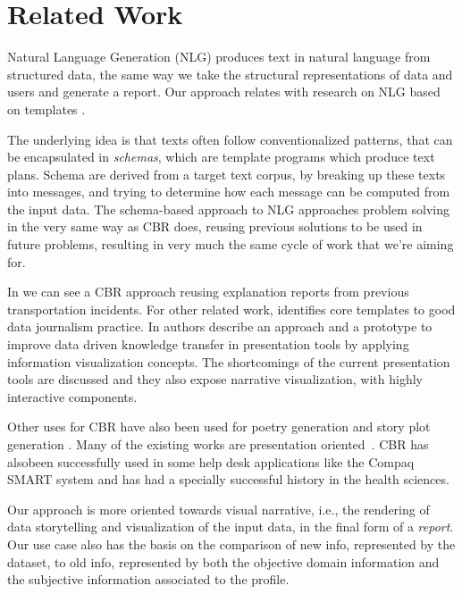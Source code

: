 \section{Related Work}
\label{cap1:sec:relatedwork}

Natural Language Generation (NLG) produces text in natural language from structured data, the same way we take the structural representations of data and users and generate a report.
Our approach relates with research on NLG  based on templates \cite{McKeown}.

The underlying idea is that texts often follow conventionalized patterns, that can be encapsulated in {\it schemas}, which are template programs which produce text plans. 
Schema are derived from a target text corpus, by breaking up these texts into messages, and trying to determine how each message can be computed from the input data. 
The schema-based approach to NLG approaches problem solving in the very same way as CBR does, reusing previous solutions to be used in future problems, resulting in very much the same cycle of work that we're aiming for.

In \cite{sizov2017} we can see a CBR approach reusing explanation reports from previous transportation incidents.
For other related work, \cite{Adegboyega2017} identifies core templates to good data journalism practice.
In \cite{Roels2017} authors describe an approach and a prototype to improve data driven knowledge transfer in presentation tools by applying information visualization concepts. 
The shortcomings of the current presentation tools are discussed and they also expose narrative visualization, with highly interactive components.

Other uses for CBR have also been used for poetry generation \cite{diaz2002} and story plot generation \cite{GervasDPH05}. 
Many of the existing works are presentation oriented~\cite{Kosara16,Roels2017}. 
CBR has alsobeen successfully used in some help desk applications like the Compaq SMART system\cite{COMPAQ} and has had a specially successful history in the health sciences\cite{HEALTH}.

Our approach is more oriented towards visual narrative, i.e., the rendering of data storytelling and visualization of the input data, in the final form of a {\it report}.
Our use case also has the basis on the comparison of new info, represented by the dataset, to old info, represented by both the objective domain information and the subjective information associated to the profile.

